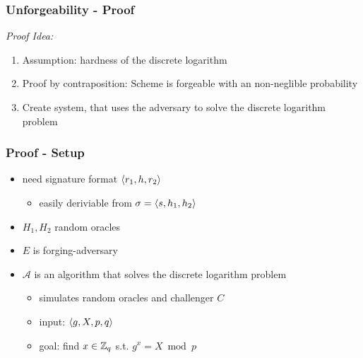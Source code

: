 \begin{frame}
	\frametitle{Unforgeability - Proof}
	
	\textit{Proof Idea:}
	\begin{enumerate}[<+->]
		\item Assumption: hardness of the discrete logarithm
		\item Proof by contraposition: Scheme is forgeable with an non-neglible probability
		\item Create system, that uses the adversary to solve the discrete logarithm problem
	\end{enumerate}
\end{frame}

\begin{frame}
	\frametitle{Proof - Setup}

	\begin{itemize}[<+->]
		\item need signature format $\langle r_1, h, r_2 \rangle$
		\begin{itemize}
			\item easily deriviable from $\sigma = \langle s, h_1, h_2 \rangle$
		\end{itemize}
		\item $H_1, H_2$ random oracles
		\item $E$ is forging-adversary
		\item $\mathcal{A}$ is an algorithm that solves the discrete logarithm problem
			\begin{itemize}
				\item simulates random oracles and challenger $C$
				\item input: $\langle g, X, p , q \rangle$
				\item goal: find $x\in\mathbb{Z}_q$ s.t. $g^x = X \bmod p$
			\end{itemize}
	\end{itemize}
\end{frame}

